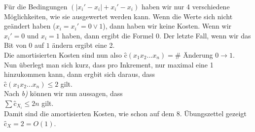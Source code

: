 \documentclass[11pt,a4paper,ngerman]{article}
\begin{document}
\begin{enumerate}[\bfseries (a)]
Für die Bedingungen $(|x_i' - x_i| + x_i' - x_i)$ haben wir nur 4 verschiedene Möglichkeiten, wie sie ausgewertet werden kann. Wenn die Werte sich nicht geändert haben ($x_i = x_i' = 0 \lor 1$), dann haben wir keine Kosten. Wenn wir $x_i'=0$ und $x_i = 1$ haben, dann ergibt die Formel $0$. Der letzte Fall, wenn wir das Bit von $0$ auf $1$ ändern ergibt eine 2.\\

Die amortisierten Kosten sind nun also $\text{\^{c}}(x_1x_2 ... x_n) = \#$ Änderung $0 \rightarrow 1$.\\
Nun überlegt man sich kurz, dass pro Inkrement, nur maximal eine 1 hinzukommen kann, dann ergbit sich daraus, dass\\
$\text{\^{c}}(x_1x_2 ... x_n)  \leq 2$ gilt.\\

Nach \emph{b)} können wir nun aussagen, dass\\
$\sum \text{\^{c}}_{X_i} \leq 2n$ gilt.\\

Damit sind die amortisierten Kosten, wie schon auf dem 8. Übungszettel gezeigt $\text{\^{c}}_X = 2 = O(1)$.

\end{enumerate}

\label{LastPage}
\end{document}
